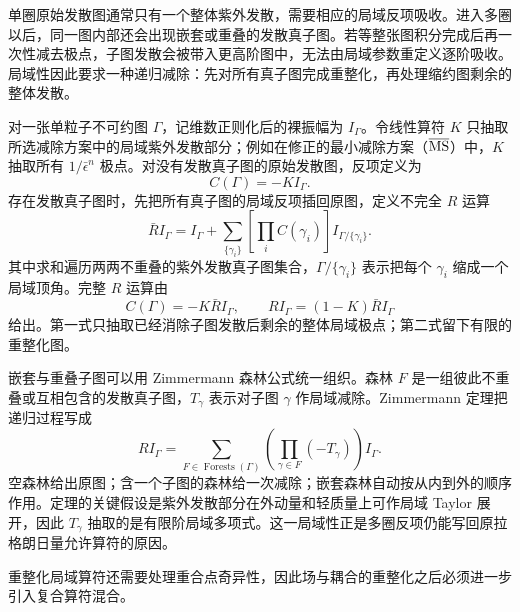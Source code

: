 单圈原始发散图通常只有一个整体紫外发散，需要相应的局域反项吸收。进入多圈以后，同一图内部还会出现嵌套或重叠的发散真子图。若等整张图积分完成后再一次性减去极点，子图发散会被带入更高阶图中，无法由局域参数重定义逐阶吸收。局域性因此要求一种递归减除：先对所有真子图完成重整化，再处理缩约图剩余的整体发散。

对一张单粒子不可约图 $\Gamma$，记维数正则化后的裸振幅为 $I_\Gamma$。令线性算符 $K$ 只抽取所选减除方案中的局域紫外发散部分；例如在修正的最小减除方案（$\overline{\rm MS}$）中，$K$ 抽取所有 $1/\bar\epsilon^n$ 极点。对没有发散真子图的原始发散图，反项定义为
\begin{equation*}
 C(\Gamma)=-K I_\Gamma.
\end{equation*}
存在发散真子图时，先把所有真子图的局域反项插回原图，定义不完全 $R$ 运算
\begin{equation}
 \boxed{
 \bar R I_\Gamma
 =I_\Gamma
 +\sum_{\{\gamma_i\}}
 \left[\prod_i C(\gamma_i)\right]
 I_{\Gamma/\{\gamma_i\}}.}
 \label{eq:rbar-operation-dp68}
\end{equation}
其中求和遍历两两不重叠的紫外发散真子图集合，$\Gamma/\{\gamma_i\}$ 表示把每个 $\gamma_i$ 缩成一个局域顶角。完整 $R$ 运算由
\begin{equation}
 \boxed{
 C(\Gamma)=-K\bar RI_\Gamma,
 \qquad
 RI_\Gamma=(1-K)\bar RI_\Gamma}
 \label{eq:r-operation-dp11}
\end{equation}
给出。第一式只抽取已经消除子图发散后剩余的整体局域极点；第二式留下有限的重整化图。

嵌套与重叠子图可以用 Zimmermann 森林公式统一组织。森林 $F$ 是一组彼此不重叠或互相包含的发散真子图，$T_\gamma$ 表示对子图 $\gamma$ 作局域减除。Zimmermann 定理把递归过程写成
\begin{equation}
 \boxed{
 RI_\Gamma
 =\sum_{F\in\operatorname{Forests}(\Gamma)}
 \left(\prod_{\gamma\in F}(-T_\gamma)\right)I_\Gamma.}
 \label{eq:zimmermann-forest-dp11}
\end{equation}
空森林给出原图；含一个子图的森林给一次减除；嵌套森林自动按从内到外的顺序作用。定理的关键假设是紫外发散部分在外动量和轻质量上可作局域 Taylor 展开，因此 $T_\gamma$ 抽取的是有限阶局域多项式。这一局域性正是多圈反项仍能写回原拉格朗日量允许算符的原因。

重整化局域算符还需要处理重合点奇异性，因此场与耦合的重整化之后必须进一步引入复合算符混合。

